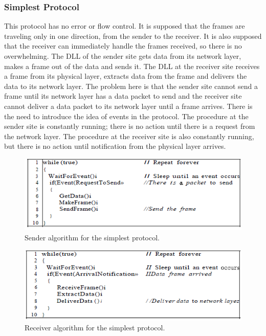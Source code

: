 \subsubsection{Simplest Protocol}
This protocol has no error or flow control. It is supposed that the frames are traveling only in one direction, from the sender to the receiver. It is also supposed that the receiver can immediately handle the frames received, so there is no overwhelming. The DLL of the sender site gets data from its network layer, makes a frame out of the data and sends it.
The DLL at the receiver site receives a frame from its physical layer, extracts data from the frame and delivers the data to its network layer. The problem here is that the sender site cannot send a frame until its network layer has a data packet to send and the receiver site cannot deliver a data packet to its network layer until a frame arrives. There is the need to introduce the idea of events in the protocol. The
procedure at the sender site is constantly running; there is no action until there is a request
from the network layer. The procedure at the receiver site is also constantly running, but
there is no action until notification from the physical layer arrives.
\begin{figure}[H]
\begin{center}
\includegraphics[scale=1]{simplestsender.PNG}
\caption{Sender algorithm for the simplest protocol.}
\end{center}
\end{figure}
\begin{figure}[H]
\begin{center}
\includegraphics[scale=1]{simplestreceiver.PNG}
\caption{Receiver algorithm for the simplest protocol.}
\end{center}
\end{figure}
